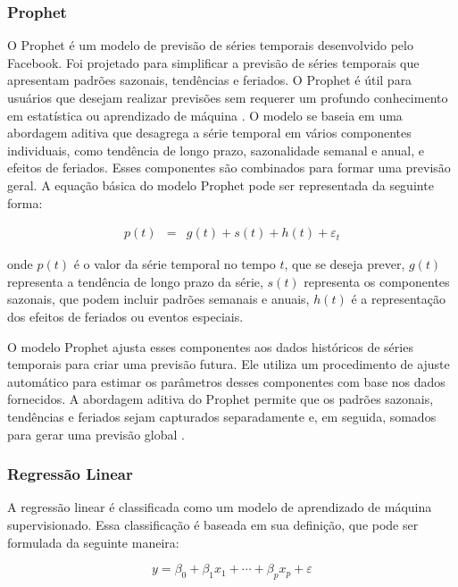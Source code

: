   \subsubsection{Prophet}
 
 O Prophet é um modelo de previsão de séries temporais desenvolvido pelo Facebook. Foi projetado para simplificar a previsão de séries temporais que apresentam padrões sazonais, tendências e feriados. O Prophet é útil para usuários que desejam realizar previsões sem requerer um profundo conhecimento em estatística ou aprendizado de máquina \cite{en16031371}. O modelo se baseia em uma abordagem aditiva que desagrega a série temporal em vários componentes individuais, como tendência de longo prazo, sazonalidade semanal e anual, e efeitos de feriados. Esses componentes são combinados para formar uma previsão geral.  A equação básica do modelo Prophet pode ser representada da seguinte forma:
 
 \begin{eqnarray}
 	p(t) &=& g(t) + s(t) + h(t) + \varepsilon_t 
 \end{eqnarray}
 
 \noindent onde $ p(t) $ é o valor da série temporal no tempo $ t $, que se deseja prever, $ g(t) $ representa a tendência de longo prazo da série, $ s(t) $ representa os componentes sazonais, que podem incluir padrões semanais e anuais, $ h(t) $ é a representação dos efeitos de feriados ou eventos especiais.
  
 O modelo Prophet ajusta esses componentes aos dados históricos de séries temporais para criar uma previsão futura. Ele utiliza um procedimento de ajuste automático para estimar os parâmetros desses componentes com base nos dados fornecidos. A abordagem aditiva do Prophet permite que os padrões sazonais, tendências e feriados sejam capturados separadamente e, em seguida, somados para gerar uma previsão global \cite{2-s2.0-85092514286}.
 
 
 \subsubsection{Regress\~ao Linear}
 
A regressão linear é classificada como um modelo de aprendizado de máquina supervisionado. Essa classificação é baseada em sua definição, que pode ser formulada da seguinte maneira:
 
 \begin{equation}
 	y = \beta_0 + \beta_1 x_1 + \cdots + \beta_p x_p + \varepsilon \label{eq:lr}
 \end{equation}
 
